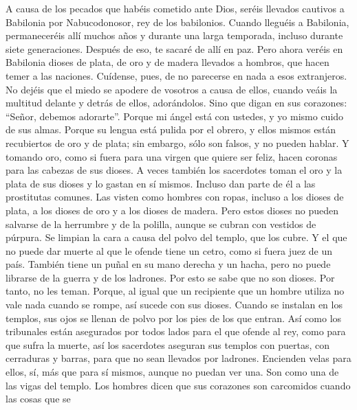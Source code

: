  A causa de los pecados que habéis cometido ante Dios,
seréis llevados cautivos a Babilonia por Nabucodonosor, rey de los
babilonios.  Cuando lleguéis a Babilonia, permaneceréis
allí muchos años y durante una larga temporada, incluso durante siete
generaciones. Después de eso, te sacaré de allí en paz. 
Pero ahora veréis en Babilonia dioses de plata, de oro y de madera
llevados a hombros, que hacen temer a las naciones. 
Cuídense, pues, de no parecerse en nada a esos extranjeros. No dejéis
que el miedo se apodere de vosotros a causa de ellos, cuando veáis la
multitud delante y detrás de ellos, adorándolos.  Sino que
digan en sus corazones: ``Señor, debemos adorarte''. 
Porque mi ángel está con ustedes, y yo mismo cuido de sus almas.
 Porque su lengua está pulida por el obrero, y ellos
mismos están recubiertos de oro y de plata; sin embargo, sólo son
falsos, y no pueden hablar.  Y tomando oro, como si fuera
para una virgen que quiere ser feliz, hacen coronas para las cabezas de
sus dioses.  A veces también los sacerdotes toman el oro
y la plata de sus dioses y lo gastan en sí mismos. 
Incluso dan parte de él a las prostitutas comunes. Las visten como
hombres con ropas, incluso a los dioses de plata, a los dioses de oro y
a los dioses de madera.  Pero estos dioses no pueden
salvarse de la herrumbre y de la polilla, aunque se cubran con vestidos
de púrpura.  Se limpian la cara a causa del polvo del
templo, que los cubre.  Y el que no puede dar muerte al
que le ofende tiene un cetro, como si fuera juez de un país.
 También tiene un puñal en su mano derecha y un hacha,
pero no puede librarse de la guerra y de los ladrones. 
Por esto se sabe que no son dioses. Por tanto, no les teman.
 Porque, al igual que un recipiente que un hombre utiliza
no vale nada cuando se rompe, así sucede con sus dioses. Cuando se
instalan en los templos, sus ojos se llenan de polvo por los pies de los
que entran.  Así como los tribunales están asegurados por
todos lados para el que ofende al rey, como para que sufra la muerte,
así los sacerdotes aseguran sus templos con puertas, con cerraduras y
barras, para que no sean llevados por ladrones. 
Encienden velas para ellos, sí, más que para sí mismos, aunque no puedan
ver una.  Son como una de las vigas del templo. Los
hombres dicen que sus corazones son carcomidos cuando las cosas que se

